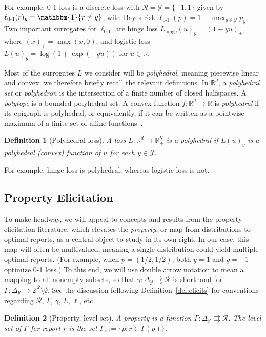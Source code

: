 \documentclass[12pt]{article}
\newcommand{\Comments}{1}
\newcommand{\mynote}[2]{\ifnum\Comments=1\textcolor{#1}{#2}\fi}
\newcommand{\jessie}[1]{\mynote{purple}{[JF: #1]}}
\newcommand{\reals}{\mathbb{R}}
\newcommand{\simplex}{\Delta_\Y}
\newcommand{\R}{\mathcal{R}}
\newcommand{\U}{\mathcal{U}}
\newcommand{\Y}{\mathcal{Y}}
\newcommand{\risk}[1]{\underline{#1}}
\newcommand{\toto}{\rightrightarrows}
\newcommand{\ones}{\mathbbm{1}}
\newcommand{\Ind}[1]{\ones\{#1\}}
\newcommand{\hinge}{L_{\mathrm{hinge}}}
\newcommand{\ellzo}{\ell_{\text{0-1}}}
\newtheorem{definition}{Definition}
\begin{document}
For example, 0-1 loss is a discrete loss with $\R = \Y = \{-1,1\}$
given by $\ellzo(r)_y = \Ind{r \neq y}$, with Bayes risk $\risk{\ellzo}(p) = 1-\max_{y\in\Y} p_y$.
Two important surrogates for $\ellzo$ are hinge loss $\hinge(u)_y = (1-yu)_+$, where $(x)_+ = \max(x,0)$, and logistic loss $L(u)_y = \log(1+\exp(-yu))$ for $u\in\reals$.

Most of the surrogates $L$ we consider will be \emph{polyhedral}, meaning piecewise linear and convex; we therefore briefly recall the relevant definitions.
In $\reals^d$, a \emph{polyhedral set} or \emph{polyhedron} is the intersection of a finite number of closed halfspaces.
A \emph{polytope} is a bounded polyhedral set.
A convex function $f:\reals^d\to\reals$ is \emph{polyhedral} if its epigraph is polyhedral, or equivalently, if it can be written as a pointwise maximum of a finite set of affine functions~\citep{rockafellar1997convex}.
%
\begin{definition}[Polyhedral loss]
  A loss $L: \reals^d \to \reals^{\Y}_+$ is a \emph{polyhedral} if $L(u)_y$ is a polyhedral (convex) function of $u$ for each $y\in\Y$.
\end{definition}
%
For example, hinge loss is polyhedral, whereas logistic loss is not.

\subsection{Property Elicitation}

To make headway, we will appeal to concepts and results from the property elicitation literature, which elevates the \emph{property}, or map from distributions to optimal reports, as a central object to study in its own right.
In our case, this map will often be multivalued, meaning a single distribution could yield multiple optimal reports.
(For example, when $p=(1/2,1/2)$, both $y=1$ and $y=-1$ optimize 0-1 loss.)
To this end, we will use double arrow notation to mean a mapping to all nonempty subsets, so that $\gamma: \simplex \toto \R$ is shorthand for $\Gamma: \simplex \to 2^{\R} \setminus \emptyset$.
See the discussion following Definition~\ref{def:elicits} for conventions regarding $\R$, $\Gamma$, $\gamma$, $L$, $\ell$, etc.

\begin{definition}[Property, level set]\label{def:property}
  A \emph{property} is a function $\Gamma:\simplex\toto\R$.
  The \emph{level set} of $\Gamma$ for report $r$ is the set $\Gamma_r := \{p : r \in \Gamma(p)\}$.
\end{definition}
\end{document}
